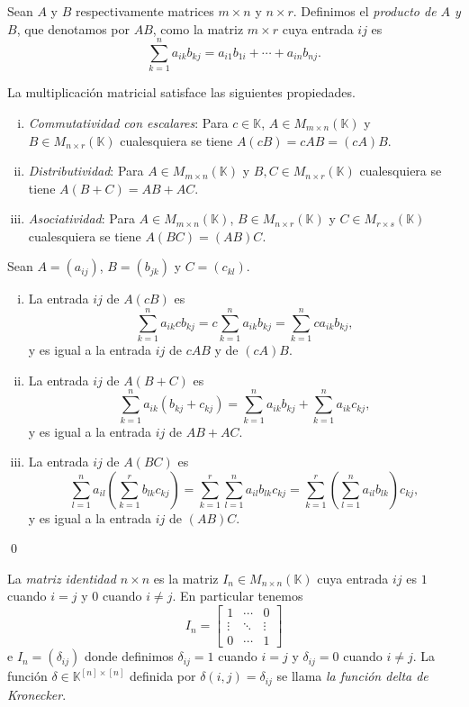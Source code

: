 \begin{defn}
Sean $A$ y $B$ respectivamente matrices $m\times n$ y $n\times r$. Definimos el \emph{producto de $A$ y $B$}, que denotamos por $AB$, como la matriz $m\times r$ cuya entrada $ij$ es
$$\sum_{k=1}^n a_{ik}b_{kj}=a_{i1}b_{1i}+\cdots+a_{in}b_{nj}.$$
\end{defn}

\begin{prop}
La multiplicaci\'on matricial satisface las siguientes propiedades.
\begin{enumerate}[(i)]
\item \emph{Commutatividad con escalares}: Para $c\in \mathbb{K}$, $A\in M_{m\times n}(\mathbb{K})$ y $B\in M_{n\times r}(\mathbb{K})$ cualesquiera se tiene $A(cB)=cAB=(cA)B$.
\item \emph{Distributividad}: Para $A\in M_{m\times n}(\mathbb{K})$ y $B,C\in M_{n\times r}(\mathbb{K})$ cualesquiera se tiene $A(B+C)=AB+AC$.
\item \emph{Asociatividad}: Para $A\in M_{m\times n}(\mathbb{K})$, $B\in M_{n\times r}(\mathbb{K})$ y $C\in M_{r\times s}(\mathbb{K})$ cualesquiera se tiene $A(BC)=(AB)C$.
\end{enumerate}
\end{prop}

\dem Sean $A=(a_{ij})$, $B=(b_{jk})$ y $C=(c_{kl})$.
\begin{enumerate}[(i)]
\item La entrada $ij$ de $A(cB)$ es
$$\sum_{k=1}^n a_{ik}cb_{kj}=c\sum_{k=1}^n a_{ik}b_{kj}=\sum_{k=1}^n ca_{ik}b_{kj},$$
y es igual a la entrada $ij$ de $cAB$ y de $(cA)B$.
\item La entrada $ij$ de $A(B+C)$ es
$$\sum_{k=1}^n a_{ik}(b_{kj}+c_{kj})=\sum_{k=1}^n a_{ik}b_{kj}+\sum_{k=1}^n a_{ik}c_{kj},$$
y es igual a la entrada $ij$ de $AB+AC$.
\item La entrada $ij$ de $A(BC)$ es
$$\sum_{l=1}^n a_{il}\left(\sum_{k=1}^r b_{lk}c_{kj}\right) = \sum_{k=1}^r\sum_{l=1}^n a_{il}b_{lk}c_{kj} = \sum_{k=1}^r\left(\sum_{l=1}^n a_{il}b_{lk}\right)c_{kj},$$
y es igual a la entrada $ij$ de $(AB)C$.
\end{enumerate}
\qed

\begin{defn}
La \emph{matriz identidad $n\times n$} es la matriz $I_n\in M_{n\times n}(\mathbb{K})$ cuya entrada $ij$ es $1$ cuando $i=j$ y $0$ cuando $i\ne j$. En particular tenemos
$$I_n=\left[\begin{array}{ccc}
1 & \cdots & 0\\
\vdots & \ddots & \vdots\\
0 & \cdots & 1
\end{array}\right]$$
e $I_n=(\delta_{ij})$ donde definimos $\delta_{ij}=1$ cuando $i=j$ y $\delta_{ij}=0$ cuando $i\ne j$. La funci\'on $\delta\in \mathbb{K}^{[n]\times [n]}$ definida por $\delta(i,j)=\delta_{ij}$ se llama \emph{la funci\'on delta de Kronecker}.  
\end{defn}

